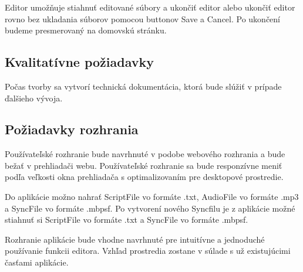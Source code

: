 \documentclass{article}
\begin{document}
\subsubsection{}
Editor umožňuje stiahnuť editované súbory a ukončiť editor alebo ukončiť editor rovno bez ukladania súborov pomocou buttonov Save a Cancel. Po ukončení budeme presmerovaný na domovskú stránku. 

\subsection{Kvalitatívne požiadavky}
Počas tvorby sa vytvorí technická dokumentácia, ktorá bude slúžiť v prípade ďalšieho vývoja.

\subsection{Požiadavky rozhrania}
Používateľské rozhranie bude navrhnuté v podobe webového rozhrania a bude bežať v prehliadači webu. Používateľské rozhranie sa bude responzívne meniť podľa veľkosti okna prehliadača s optimalizovaním pre desktopové prostredie.

Do aplikácie možno nahrať ScriptFile vo formáte .txt, AudioFile vo formáte .mp3 a SyncFile vo formáte .mbpsf. Po vytvorení nového Syncfilu je z aplikácie možné stiahnuť si ScriptFile vo formáte .txt a SyncFile vo formáte .mbpsf.

Rozhranie aplikácie bude vhodne navrhnuté pre intuitívne a jednoduché používanie funkcii editora. Vzhľad prostredia zostane v súlade s už existujúcimi časťami aplikácie.
\end{document}
